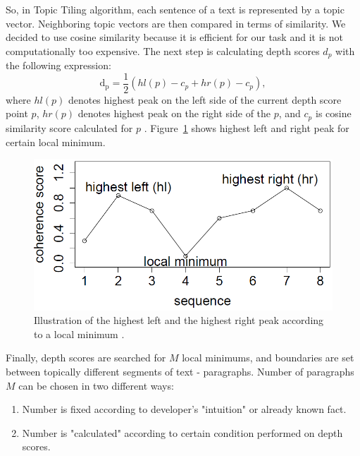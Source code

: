 \documentclass[10pt, a4paper]{article}
\begin{document}
So, in Topic Tiling algorithm, each sentence of a text is represented by a topic vector. Neighboring topic vectors are then compared in terms of similarity. We decided to use cosine similarity because it is efficient for our task and it is not computationally too expensive. The next step is calculating depth scores $d_p$ with the following expression:
\begin{equation}\label{eq:depth-scores}
\mathrm{d_p} = \frac{1}{2} (hl(p) - c_p + hr(p) - c_p),
\end{equation}
where $hl(p)$ denotes highest peak on the left side of the current depth score point $p$, $hr(p)$ denotes highest peak on the right side of the $p$, and $c_p$ is cosine similarity score calculated for $p$ \citep{ref-asistent}. Figure~\ref{fig:figure1} shows highest left and right peak for certain local minimum.
\begin{figure}
\begin{center}
\includegraphics[width=\columnwidth]{depth_scores.jpg}
\caption{Illustration of the highest left and the highest right peak according to a local minimum \citep{ref-asistent}.}
\label{fig:figure1}
\end{center}
\end{figure}
Finally, depth scores are searched for $M$ local minimums, and boundaries are set between topically different segments of text - paragraphs. Number of paragraphs $M$ can be chosen in two different ways:
\begin{enumerate}
\item Number is fixed according to developer's "intuition" or already known fact.
\item Number is "calculated" according to certain condition performed on depth scores.
\end{enumerate}
\end{document}
